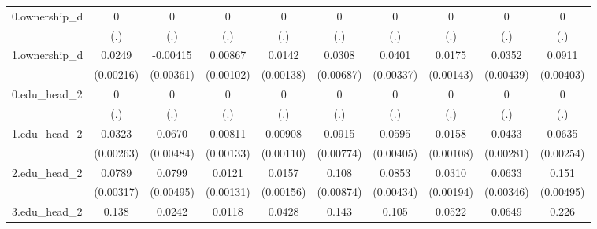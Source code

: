 \begin{table}[htbp]
\begin{tabular}{l*{9}{c}}
0.ownership\_d&           0         &           0         &           0         &           0         &           0         &           0         &           0         &           0         &           0         \\
            &         (.)         &         (.)         &         (.)         &         (.)         &         (.)         &         (.)         &         (.)         &         (.)         &         (.)         \\
1.ownership\_d&      0.0249\sym{***}&    -0.00415         &     0.00867\sym{***}&      0.0142\sym{***}&      0.0308\sym{***}&      0.0401\sym{***}&      0.0175\sym{***}&      0.0352\sym{***}&      0.0911\sym{***}\\
            &   (0.00216)         &   (0.00361)         &   (0.00102)         &   (0.00138)         &   (0.00687)         &   (0.00337)         &   (0.00143)         &   (0.00439)         &   (0.00403)         \\
0.edu\_head\_2&           0         &           0         &           0         &           0         &           0         &           0         &           0         &           0         &           0         \\
            &         (.)         &         (.)         &         (.)         &         (.)         &         (.)         &         (.)         &         (.)         &         (.)         &         (.)         \\
1.edu\_head\_2&      0.0323\sym{***}&      0.0670\sym{***}&     0.00811\sym{***}&     0.00908\sym{***}&      0.0915\sym{***}&      0.0595\sym{***}&      0.0158\sym{***}&      0.0433\sym{***}&      0.0635\sym{***}\\
            &   (0.00263)         &   (0.00484)         &   (0.00133)         &   (0.00110)         &   (0.00774)         &   (0.00405)         &   (0.00108)         &   (0.00281)         &   (0.00254)         \\
2.edu\_head\_2&      0.0789\sym{***}&      0.0799\sym{***}&      0.0121\sym{***}&      0.0157\sym{***}&       0.108\sym{***}&      0.0853\sym{***}&      0.0310\sym{***}&      0.0633\sym{***}&       0.151\sym{***}\\
            &   (0.00317)         &   (0.00495)         &   (0.00131)         &   (0.00156)         &   (0.00874)         &   (0.00434)         &   (0.00194)         &   (0.00346)         &   (0.00495)         \\
3.edu\_head\_2&       0.138\sym{***}&      0.0242\sym{***}&      0.0118\sym{***}&      0.0428\sym{***}&       0.143\sym{***}&       0.105\sym{***}&      0.0522\sym{***}&      0.0649\sym{***}&       0.226\sym{***}\\

\end{tabular}
\end{table}
